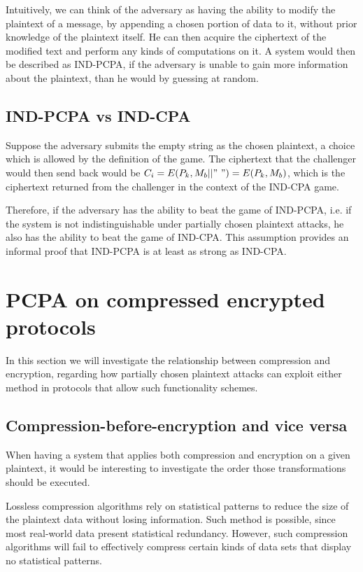 Intuitively, we can think of the adversary as having the ability to modify the
plaintext of a message, by appending a chosen portion of data to it, without
prior knowledge of the plaintext itself. He can then acquire the ciphertext of
the modified text and perform any kinds of computations on it. A system would
then be described as IND-PCPA, if the adversary is unable to gain more
information about the plaintext, than he would by guessing at random.

\subsection{IND-PCPA vs IND-CPA}

Suppose the adversary submits the empty string as the chosen plaintext, a choice
which is allowed by the definition of the game. The ciphertext that the
challenger would then send back would be \begin{math}C_i = E(P_k, M_b||"\ ") =
E(P_k, M_b)\end{math}, which is the ciphertext returned from the challenger in
the context of the IND-CPA game.

Therefore, if the adversary has the ability to beat the game of IND-PCPA, i.e.
if the system is not indistinguishable under partially chosen plaintext attacks,
he also has the ability to beat the game of IND-CPA. This assumption
provides an informal proof that IND-PCPA is at least as strong as IND-CPA.

\section{PCPA on compressed encrypted protocols}\label{sec:cepcpa}

In this section we will investigate the relationship between compression and
encryption, regarding how partially chosen plaintext attacks can exploit either
method in protocols that allow such functionality schemes.

\subsection{Compression-before-encryption and vice versa}

When having a system that applies both compression and encryption on a given
plaintext, it would be interesting to investigate the order those
transformations should be executed.

Lossless compression algorithms rely on statistical patterns to reduce the size
of the plaintext data without losing information. Such method is possible, since
most real-world data present statistical redundancy. However, such compression
algorithms will fail to effectively compress certain kinds of data sets that
display no statistical patterns.

